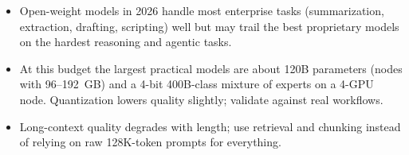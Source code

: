 \begin{itemize}
  \item Open-weight models in 2026 handle most enterprise tasks (summarization,
    extraction, drafting, scripting) well but may trail the best proprietary models on
    the hardest reasoning and agentic tasks.
  \item At this budget the largest practical models are about 120B parameters
    (nodes with 96--192~GB) and a 4-bit 400B-class mixture of experts on a 4-GPU
    node. Quantization lowers quality slightly; validate against real workflows.
  \item Long-context quality degrades with length; use retrieval and chunking instead of
    relying on raw 128K-token prompts for everything.
\end{itemize}
